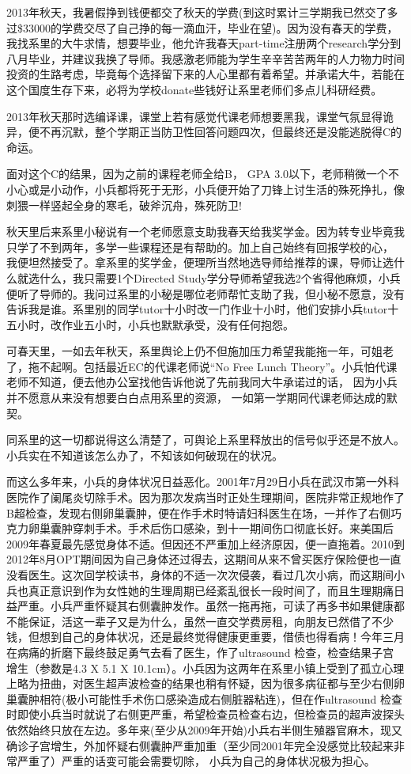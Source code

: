 \documentclass[12pt]{book}
\begin{document}
2013年秋天，我暑假挣到钱便都交了秋天的学费(到这时累计三学期我已然交了多过\$33000的学费交尽了自己挣的每一滴血汗，毕业在望)。因为没有春天的学费，我找系里的大牛求情，想要毕业，他允许我春天part-time注册两个research学分到八月毕业，并建议我换了导师。我感激老师能为学生辛辛苦苦两年的人力物力时间投资的生路考虑，毕竟每个选择留下来的人心里都有着希望。并承诺大牛，若能在这个国度生存下来，必将为学校donate些钱好让系里老师们多点儿科研经费。

2013年秋天那时选编译课，课堂上若有感觉代课老师想要黑我，课堂气氛显得诡异，便不再沉默，整个学期正当防卫性回答问题四次，但最终还是没能逃脱得C的命运。

面对这个C的结果，因为之前的课程老师全给B， GPA 3.0以下，老师稍微一个不小心或是小动作，小兵都将死于无形，小兵便开始了刀锋上讨生活的殊死挣扎，像刺猥一样竖起全身的寒毛，破斧沉舟，殊死防卫!

秋天里后来系里小秘说有一个老师愿意支助我春天给我奖学金。因为转专业毕竟我只学了不到两年，多学一些课程还是有帮助的。加上自己始终有回报学校的心， 我便坦然接受了。拿系里的奖学金，便理所当然地选导师给推荐的课，导师让选什么就选什么，我只需要1个Directed Study学分导师希望我选2个省得他麻烦，小兵便听了导师的。我问过系里的小秘是哪位老师帮忙支助了我，但小秘不愿意，没有告诉我是谁。系里别的同学tutor十小时改一门作业十小时，他们安排小兵tutor十五小时，改作业五小时，小兵也默默承受，没有任何抱怨。

可春天里，一如去年秋天，系里舆论上仍不但施加压力希望我能拖一年，可姐老了，拖不起啊。包括最近EC的代课老师说“No Free Lunch Theory”。小兵怕代课老师不知道，便去他办公室找他告诉他说了先前我同大牛承诺过的话， 因为小兵并不愿意从来没有想要白白点用系里的资源， 一如第一学期同代课老师达成的默契。

同系里的这一切都说得这么清楚了，可舆论上系里释放出的信号似乎还是不放人。小兵实在不知道该怎么办了，不知该如何破现在的状况。

而这么多年来，小兵的身体状况日益恶化。2001年7月29日小兵在武汉市第一外科医院作了阑尾炎切除手术。因为那次发病当时正处生理期间，医院非常正规地作了B超检查，发现右侧卵巢囊肿，便在作手术时特请妇科医生在场，一并作了右侧巧克力卵巢囊肿穿刺手术。手术后伤口感染，到十一期间伤口彻底长好。来美国后2009年春夏最先感觉身体不适。但因还不严重加上经济原因，便一直拖着。2010到2012年8月OPT期间因为自己身体还过得去，这期间从来不曾买医疗保险便也一直没看医生。这次回学校读书，身体的不适一次次侵袭，看过几次小病，而这期间小兵也真正意识到作为女性她的生理周期已经紊乱很长一段时间了，而且生理期痛日益严重。小兵严重怀疑其右侧囊肿发作。虽然一拖再拖，可读了再多书如果健康都不能保证，活这一辈子又是为什么，虽然一直交学费房租，向朋友已然借了不少钱，但想到自己的身体状况，还是最终觉得健康更重要，借债也得看病！今年三月在病痛的折磨下最终鼓足勇气去看了医生，作了ultrasound 检查，检查结果子宫增生（参数是4.3 X 5.1 X 10.1cm）。小兵因为这两年在系里小镇上受到了孤立心理上略为扭曲，对医生超声波检查的结果也稍有怀疑，因为很多病征都与至少右侧卵巢囊肿相符(极小可能性手术伤口感染造成右侧脏器粘连)，但在作ultrasound 检查时即使小兵当时就说了右侧更严重，希望检查员检查右边，但检查员的超声波探头依然始终只放在左边。多年来(至少从2009年开始)小兵右半侧生殖器官麻木，现又确诊子宫增生，外加怀疑右侧囊肿严重加重（至少同2001年完全没感觉比较起来非常严重了）严重的话变可能会需要切除， 小兵为自己的身体状况极为担心。
\end{document}

